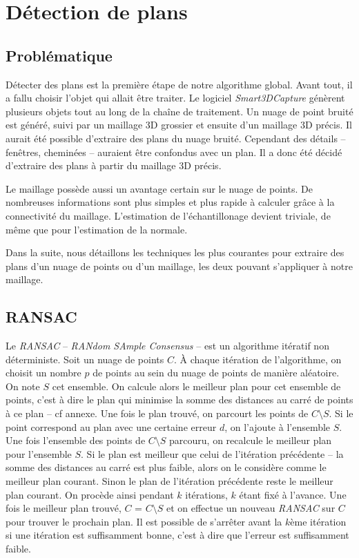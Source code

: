 ﻿\documentclass[12pt, twoside]{article}
\let\oldsection\section
\def\section{\cleardoublepage\oldsection}
\begin{document}
\section{Détection de plans}
\subsection{Problématique}
Détecter des plans est la première étape de notre algorithme global. Avant tout, il a fallu choisir l'objet qui allait être traiter. Le logiciel \textit{Smart3DCapture} génèrent plusieurs objets tout au long de la chaîne de traitement. Un nuage de point bruité est généré, suivi par un maillage 3D grossier et ensuite d'un maillage 3D précis. Il aurait été possible d'extraire des plans du nuage bruité. Cependant des détails -- fenêtres, cheminées -- auraient être confondus avec un plan. Il a donc été décidé d'extraire des plans à partir du maillage 3D précis.

Le maillage possède aussi un avantage certain sur le nuage de points. De nombreuses informations sont plus simples et plus rapide à calculer grâce à la connectivité du maillage. L'estimation de l'échantillonage devient triviale, de même que pour l'estimation de la normale.

Dans la suite, nous détaillons les techniques les plus courantes pour extraire des plans d'un nuage de points ou d'un maillage, les deux pouvant s'appliquer à notre maillage.

\subsection{RANSAC}
Le \textit{RANSAC} -- \textit{RANdom SAmple Consensus} -- est un algorithme itératif non déterministe. Soit un nuage de points $C$. À chaque itération de l’algorithme, on choisit un nombre $p$ de points au sein du nuage de points de manière aléatoire. On note $S$ cet ensemble. On calcule alors le meilleur plan pour cet ensemble de points, c’est à dire le plan qui minimise la somme des distances au carré de points à ce plan -- cf annexe. Une fois le plan trouvé, on parcourt les points de $C\setminus S$. Si le point correspond au plan avec une certaine erreur $d$, on l’ajoute à l’ensemble $S$. Une fois l’ensemble des points de $C\setminus S$ parcouru, on recalcule le meilleur plan pour l’ensemble $S$. Si le plan est meilleur que celui de l’itération précédente -- la somme des distances au carré est plus faible, alors on le considère comme le meilleur plan courant. Sinon le plan de l’itération précédente reste le meilleur plan courant. On procède ainsi pendant $k$ itérations, $k$ étant fixé à l’avance. Une fois le meilleur plan trouvé, $C$ = $C\setminus S$ et on effectue un nouveau \textit{RANSAC} sur $C$ pour trouver le prochain plan. Il est possible de s’arrêter avant la $k$ème itération si une itération est suffisamment bonne, c’est à dire que l’erreur est suffisamment faible.
\end{document}
